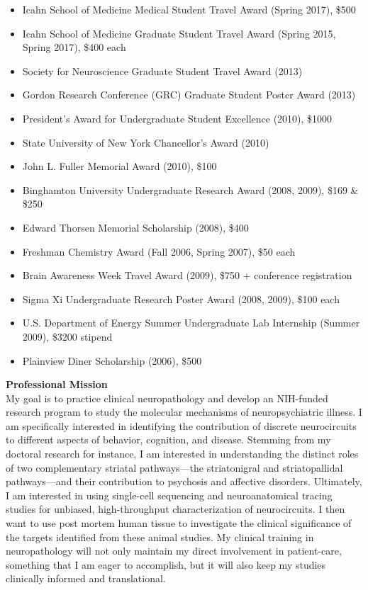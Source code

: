 \documentclass[10pt]{article}
\begin{document}
\begin{itemize}
  \item Icahn School of Medicine Medical Student Travel Award (Spring 2017), \$500
  \item Icahn School of Medicine Graduate Student Travel Award (Spring 2015, Spring 2017), \$400 each
  \item Society for Neuroscience Graduate Student Travel Award (2013)
  \item Gordon Research Conference (GRC) Graduate Student Poster Award (2013)
  \item President's Award for Undergraduate Student Excellence (2010), \$1000
  \item State University of New York Chancellor's Award (2010)
  \item John L. Fuller Memorial Award (2010), \$100
  \item Binghamton University Undergraduate Research Award (2008, 2009), \$169 \& \$250
  \item Edward Thorsen Memorial Scholarship (2008), \$400
  \item Freshman Chemistry Award (Fall 2006, Spring 2007), \$50 each
  \item Brain Awareness Week Travel Award (2009), \$750 + conference registration
  \item Sigma Xi Undergraduate Research Poster Award (2008, 2009), \$100 each
  \item U.S. Department of Energy Summer Undergraduate Lab Internship (Summer 2009), \$3200 stipend
  \item Plainview Diner Scholarship (2006), \$500

\end{itemize}

\vspace{0.1in}
{\large \textbf{Professional Mission}}\\
\vspace{0.1in}
My goal is to practice clinical neuropathology and develop an NIH-funded research program to study the molecular mechanisms of neuropsychiatric illness. I am specifically interested in identifying the contribution of discrete neurocircuits to different aspects of behavior, cognition, and disease. Stemming from my doctoral research for instance, I am interested in understanding the distinct roles of two complementary striatal pathways—the striatonigral and striatopallidal pathways—and their contribution to psychosis and affective disorders. Ultimately, I am interested in using single-cell sequencing and neuroanatomical tracing studies for unbiased, high-throughput characterization of neurocircuits. I then want to use post mortem human tissue to investigate the clinical significance of the targets identified from these animal studies. My clinical training in neuropathology will not only maintain my direct involvement in  patient-care, something that I am eager to accomplish, but it will also keep my studies clinically informed and translational.
\end{document}
